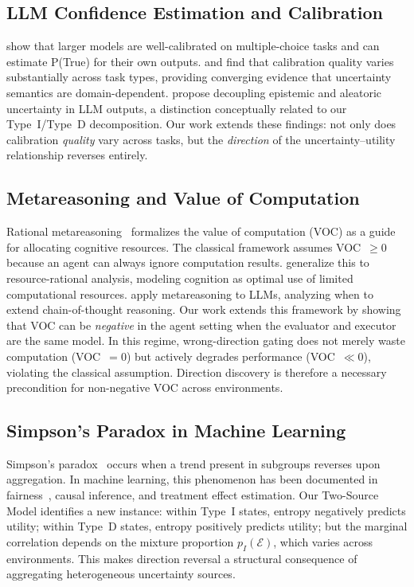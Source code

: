 \subsection{LLM Confidence Estimation and Calibration}

\citet{kadavath2022knowwhat} show that larger models are
well-calibrated on multiple-choice tasks and can estimate P(True)
for their own outputs.
\citet{tao2025revisiting} and \citet{heo2025llmuncertainty} find
that calibration quality varies substantially across task types,
providing converging evidence that uncertainty semantics are
domain-dependent.
\citet{yadkori2024believe} propose decoupling epistemic and
aleatoric uncertainty in LLM outputs, a distinction conceptually
related to our Type~I/Type~D decomposition.
Our work extends these findings: not only does calibration
\emph{quality} vary across tasks, but the \emph{direction} of the
uncertainty--utility relationship reverses entirely.

\subsection{Metareasoning and Value of Computation}

Rational metareasoning~\citep{russell1991right,
horvitz1987reasoning} formalizes the value of computation (VOC)
as a guide for allocating cognitive resources. The classical
framework assumes VOC~$\geq 0$ because an agent can always ignore
computation results. \citet{lieder2020resource} generalize this to
resource-rational analysis, modeling cognition as optimal use of
limited computational resources.
\citet{desabbata2024metareasoning} apply metareasoning to LLMs,
analyzing when to extend chain-of-thought reasoning.
Our work extends this framework by showing that VOC can be
\emph{negative} in the agent setting when the evaluator and executor
are the same model. In this regime, wrong-direction gating does not
merely waste computation (VOC~$= 0$) but actively degrades
performance (VOC~$\ll 0$), violating the classical assumption.
Direction discovery is therefore a necessary precondition for
non-negative VOC across environments.

\subsection{Simpson's Paradox in Machine Learning}

Simpson's paradox~\citep{simpson1951interpretation,
pearl2014understanding} occurs when a trend present in subgroups
reverses upon aggregation. In machine learning, this phenomenon has
been documented in fairness~\citep{kdd2023simpson}, causal
inference, and treatment effect estimation. Our Two-Source Model
identifies a new instance: within Type~I states, entropy negatively
predicts utility; within Type~D states, entropy positively predicts
utility; but the marginal correlation depends on the mixture
proportion $p_I(\mathcal{E})$, which varies across environments.
This makes direction reversal a structural consequence of
aggregating heterogeneous uncertainty sources.

